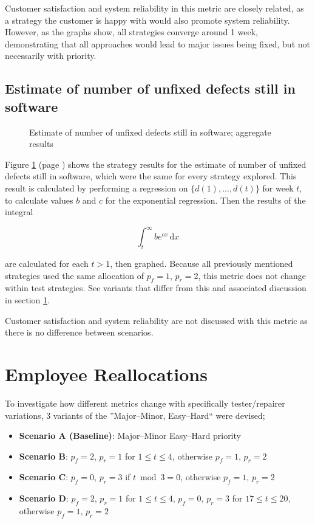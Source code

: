 \documentclass[a4paper,10pt]{article}
\begin{document}
Customer satisfaction and system reliability in this metric are closely related, as a strategy the customer is happy with would also promote system reliability. However, as the graphs show, all strategies converge around 1 week, demonstrating that all approaches would lead to major issues being fixed, but not necessarily with priority.

\subsection{Estimate of number of unfixed defects still in software}
\begin{figure}
  \centering
  
  \caption{Estimate of number of unfixed defects still in software; aggregate results}
  \label{agg:remainingbugs}
\end{figure}

Figure \ref{agg:remainingbugs} (page \pageref{agg:remainingbugs}) shows the strategy results for the estimate of number of unfixed defects still in software, which were the same for every strategy explored. This result is calculated by performing a regression on $\{d(1), ..., d(t)\}$ for week $t$, to calculate values $b$ and $c$ for the exponential regression. Then the results of the integral

$$\int_{t}^{\infty} \! be^{cx} \, \mathrm{d}x$$

are calculated for each $t > 1$, then graphed. Because all previously mentioned strategies used the same allocation of $p_f = 1$, $p_r = 2$, this metric does not change within test strategies. See variants that differ from this and associated discussion in section \ref{defectminimisation}.

Customer satisfaction and system reliability are not discussed with this metric as there is no difference between scenarios.

\section{Employee Reallocations}
\label{defectminimisation}

To investigate how different metrics change with specifically tester/repairer variations, 3 variants of the ''Major--Minor, Easy--Hard`` were devised;

\begin{itemize}
  \item \textbf{Scenario A (Baseline)}: Major--Minor Easy--Hard priority
  
  \item \textbf{Scenario B}: $p_{f} = 2$, $p_{r} = 1$ for $1 \leq t \leq 4$, otherwise $p_{f} = 1$, $p_{r} = 2$
  
  \item \textbf{Scenario C}: $p_{f} = 0$, $p_{r} = 3$ if $t \bmod 3 = 0$, otherwise $p_{f} = 1$, $p_{r} = 2$
  
  \item \textbf{Scenario D}: $p_{f} = 2$, $p_{r} = 1$ for $1 \leq t \leq 4$, $p_{f} = 0$, $p_{r} = 3$ for $17 \leq t \leq 20$, otherwise $p_{f} = 1$, $p_{r} = 2$
  
\end{itemize}
\end{document}
